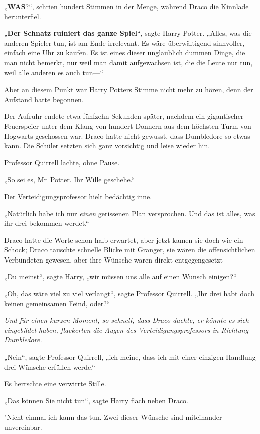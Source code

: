 {„\textbf{WAS}?“, schrien hundert Stimmen in der Menge, während Draco die Kinnlade herunterfiel.

„\textbf{Der Schnatz ruiniert das ganze Spiel}“, sagte Harry Potter. „Alles, was die anderen Spieler tun, ist am Ende irrelevant. Es wäre überwältigend sinnvoller, einfach eine Uhr zu kaufen. Es ist eines dieser unglaublich dummen Dinge, die man nicht bemerkt, nur weil man damit aufgewachsen ist, die die Leute nur tun, weil alle anderen es auch tun—“

Aber an diesem Punkt war Harry Potters Stimme nicht mehr zu hören, denn der Aufstand hatte begonnen.

Der Aufruhr endete etwa fünfzehn Sekunden später, nachdem ein gigantischer Feuerspeier unter dem Klang von hundert Donnern aus dem höchsten Turm von Hogwarts geschossen war. Draco hatte nicht gewusst, dass Dumbledore so etwas kann. Die Schüler setzten sich ganz vorsichtig und leise wieder hin.

Professor Quirrell lachte, ohne Pause.

„So sei es, Mr~Potter. Ihr Wille geschehe.“

Der Verteidigungsprofessor hielt bedächtig inne.

„Natürlich habe ich nur \emph{einen} gerissenen Plan versprochen. Und das ist alles, was ihr drei bekommen werdet.“

Draco hatte die Worte schon halb erwartet, aber jetzt kamen sie doch wie ein Schock; Draco tauschte schnelle Blicke mit Granger, sie wären die offensichtlichen Verbündeten gewesen, aber ihre Wünsche waren direkt entgegengesetzt—

„Du meinst“, sagte Harry, „wir müssen uns alle auf einen Wunsch einigen?“

„Oh, das wäre viel zu viel verlangt“, sagte Professor Quirrell. „Ihr drei habt doch keinen gemeinsamen Feind, oder?“

\emph{Und für einen kurzen Moment, so schnell, dass Draco dachte, er könnte es sich eingebildet haben, flackerten die Augen des Verteidigungsprofessors in Richtung Dumbledore.}

„Nein“, sagte Professor Quirrell, „ich meine, dass ich mit einer einzigen Handlung drei Wünsche erfüllen werde.“

Es herrschte eine verwirrte Stille.

„Das können Sie nicht tun“, sagte Harry flach neben Draco.

"Nicht einmal ich kann das tun. Zwei dieser Wünsche sind miteinander unvereinbar.

}
